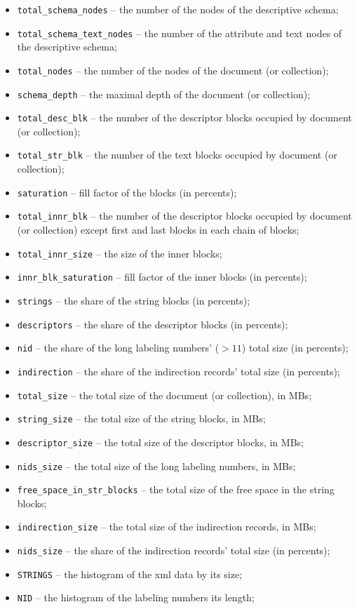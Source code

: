 \documentclass[a4paper,12pt]{article}
\newenvironment{citemize}
{\begin{itemize}
  \setlength{\itemsep}{0pt}
  \setlength{\parskip}{0pt}
  \setlength{\parsep}{0pt}}
{\end{itemize}}
\begin{document}
\begin{citemize}
\item\verb!total_schema_nodes! -- the number of the nodes of the descriptive
schema;
\item\verb!total_schema_text_nodes! -- the number of the attribute and text
nodes of the descriptive schema;
\item\verb!total_nodes! -- the number of the nodes of the document (or
collection);
\item\verb!schema_depth! -- the maximal depth of the document (or collection);
\item\verb!total_desc_blk! -- the number of the descriptor blocks occupied by
document (or collection);
\item\verb!total_str_blk! -- the number of the text blocks occupied by document
(or collection);
\item\verb!saturation! -- fill factor of the blocks (in percents);
\item\verb!total_innr_blk! -- the number of the descriptor blocks occupied by
document (or collection) except first and last blocks in each chain of blocks;
\item\verb!total_innr_size! -- the size of the inner blocks;
\item\verb!innr_blk_saturation! -- fill factor of the inner blocks (in
percents);
\item\verb!strings! -- the share of  the string blocks (in percents);
\item\verb!descriptors! -- the share of  the descriptor blocks (in percents);
\item\verb!nid! -- the share of the long labeling numbers' ($>11$) total size
(in percents);
\item\verb!indirection! -- the share of the indirection records' total size (in
percents);
\item\verb!total_size! -- the total size of the document (or collection), in
MBs;
\item\verb!string_size! -- the total size of the string blocks, in MBs;
\item\verb!descriptor_size! -- the total size of the descriptor blocks, in MBs;
\item\verb!nids_size! -- the total size of the long labeling numbers, in MBs;
\item\verb!free_space_in_str_blocks! -- the total size of the free space in the
string blocks;
\item\verb!indirection_size! -- the total size of the indirection records, in
MBs;
\item\verb!nids_size! -- the share of the indirection records' total size (in
percents);
\item\verb!STRINGS! -- the histogram of the xml data by its size;
\item\verb!NID! -- the histogram of the labeling numbers its length;
\end{citemize}
\end{document}
